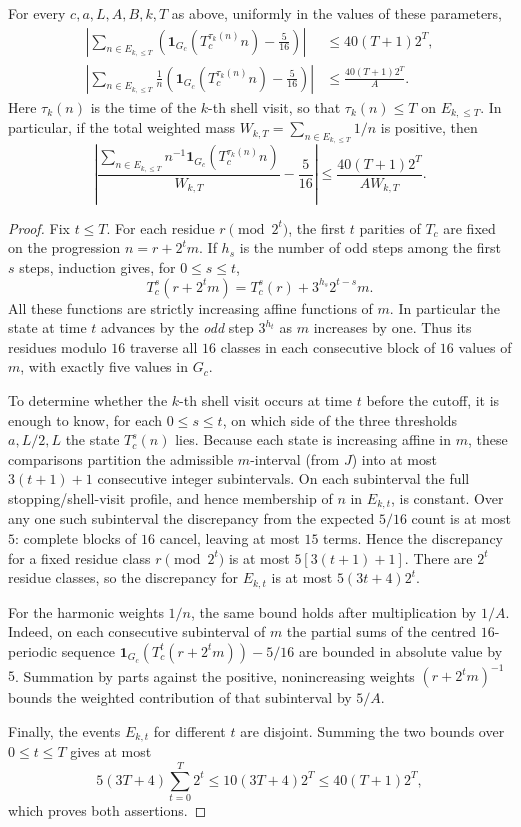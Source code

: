 \begin{proposition}
\label{prop:finite-horizon-transport}
For every $c,a,L,A,B,k,T$ as above, uniformly in the values of
these parameters,
\begin{align}
 \left|\sum_{n\in E_{k,\le T}}
  \left(\mathbf1_{G_c}(T_c^{\tau_k(n)}n)-\frac5{16}\right)\right|
  &\le40(T+1)2^T,\label{eq:finite-horizon-count}\\
 \left|\sum_{n\in E_{k,\le T}}\frac1n
  \left(\mathbf1_{G_c}(T_c^{\tau_k(n)}n)-\frac5{16}\right)\right|
  &\le\frac{40(T+1)2^T}{A}.\label{eq:finite-horizon-log}
\end{align}
Here $\tau_k(n)$ is the time of the $k$-th shell visit, so that
$\tau_k(n)\le T$ on $E_{k,\le T}$. In particular, if the total
weighted mass $W_{k,T}=\sum_{n\in E_{k,\le T}}1/n$ is positive, then
\[
 \left|\frac{\sum_{n\in E_{k,\le T}}
                n^{-1}\mathbf1_{G_c}(T_c^{\tau_k(n)}n)}{W_{k,T}}
      -\frac5{16}\right|
 \le\frac{40(T+1)2^T}{A W_{k,T}}.
\]
\end{proposition}
\begin{proof}
Fix $t\le T$. For each residue $r\pmod{2^t}$, the first $t$
parities of $T_c$ are fixed on the progression $n=r+2^t m$.
If $h_s$ is the number of odd steps among the first $s$ steps,
induction gives, for $0\le s\le t$,
\[
 T_c^s(r+2^t m)=T_c^s(r)+3^{h_s}2^{t-s}m.
\]
All these functions are strictly increasing affine functions of $m$.
In particular the state at time $t$ advances by the \emph{odd} step
$3^{h_t}$ as $m$ increases by one. Thus its residues modulo $16$
traverse all $16$ classes in each consecutive block of $16$ values
of $m$, with exactly five values in $G_c$.

To determine whether the $k$-th shell visit occurs at time $t$
before the cutoff, it is enough to know, for each $0\le s\le t$,
on which side of the three thresholds $a,L/2,L$ the state
$T_c^s(n)$ lies. Because each state is increasing affine in $m$,
these comparisons partition the admissible $m$-interval (from $J$)
into at most $3(t+1)+1$ consecutive integer subintervals. On each
subinterval the full stopping/shell-visit profile, and hence
membership of $n$ in $E_{k,t}$, is constant. Over any one such
subinterval the discrepancy from the expected $5/16$ count is
at most $5$: complete blocks of $16$ cancel, leaving at most
$15$ terms. Hence the discrepancy for a fixed residue class
$r\pmod{2^t}$ is at most $5[3(t+1)+1]$. There are $2^t$
residue classes, so the discrepancy for $E_{k,t}$ is at most
$5(3t+4)2^t$.

For the harmonic weights $1/n$, the same bound holds after
multiplication by $1/A$. Indeed, on each consecutive subinterval
of $m$ the partial sums of the centred $16$-periodic sequence
$\mathbf1_{G_c}(T_c^t(r+2^t m))-5/16$ are bounded in absolute
value by $5$. Summation by parts against the positive,
nonincreasing weights $(r+2^t m)^{-1}$ bounds the weighted
contribution of that subinterval by $5/A$.

Finally, the events $E_{k,t}$ for different $t$ are disjoint.
Summing the two bounds over $0\le t\le T$ gives at most
\[
 5(3T+4)\sum_{t=0}^T2^t
 \le 10(3T+4)2^T\le40(T+1)2^T,
\]
which proves both assertions.
\end{proof}

